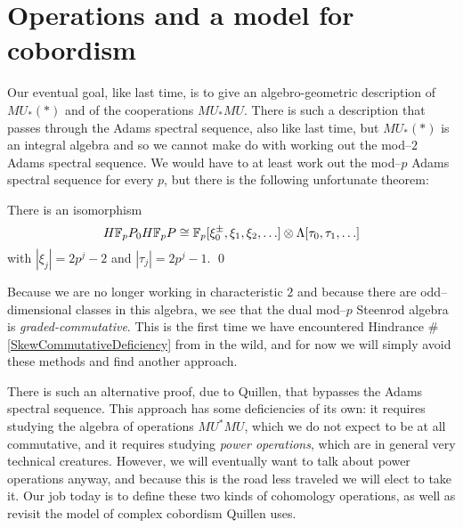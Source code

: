 







\section{Operations and a model for cobordism}

Our eventual goal, like last time, is to give an algebro-geometric description of $MU_*(*)$ and of the cooperations $MU_* MU$.  There is such a description that passes through the Adams spectral sequence, also like last time, but $MU_*(*)$ is an integral algebra and so we cannot make do with working out the mod--$2$ Adams spectral sequence.  We would have to at least work out the mod--$p$ Adams spectral sequence for every $p$, but there is the following unfortunate theorem:
\begin{theorem}
There is an isomorphism
\[H\mathbb F_pP_0 H\mathbb F_pP \cong \mathbb F_p[\xi_0^\pm, \xi_1, \xi_2, \ldots] \otimes \Lambda[\tau_0, \tau_1, \ldots]\]
with $|\xi_j| = 2p^j-2$ and $|\tau_j| = 2p^j - 1$. \qed
\end{theorem}
\noindent Because we are no longer working in characteristic $2$ and because there are odd--dimensional classes in this algebra, we see that the dual mod--$p$ Steenrod algebra is \emph{graded-commutative}.  This is the first time we have encountered Hindrance \#\ref{SkewCommutativeDeficiency} from  in the wild, and for now we will simply avoid these methods and find another approach.

There is such an alternative proof, due to Quillen, that bypasses the Adams spectral sequence.  This approach has some deficiencies of its own: it requires studying the algebra of operations $MU^* MU$, which we do not expect to be at all commutative, and it requires studying \textit{power operations}, which are in general very technical creatures.  However, we will eventually want to talk about power operations anyway, and because this is the road less traveled we will elect to take it.  Our job today is to define these two kinds of cohomology operations, as well as revisit the model of complex cobordism Quillen uses.

